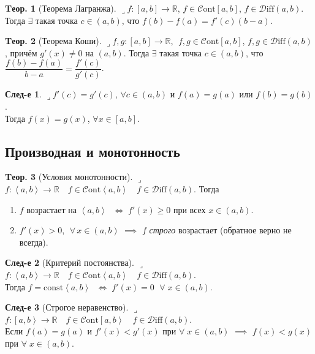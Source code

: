 \documentclass[a4paper,12pt]{article}
\newenvironment{onsamepage} {\begin{minipage}{\textwidth}} {\end{minipage}}
\numberwithin{figure}{section}
\theoremstyle{definition}
\newtheorem{theorem}{Tеор.}[section]
\newtheorem*{corollary}{След-е} %
\def\R{\mathbb{R}}
\def\Cont{\!\in\!\mathcal{C}\mathrm{ont}}
\def\Diff{\!\in\!\mathcal{D}\mathrm{iff}}
\def\on{\!:}
\def\geqs{\geqslant}
\def\intab{\left<a,b\right>}
\def\lets{{\huge$\lrcorner$}\space}
\def\iff{$\;\Longleftrightarrow\;$}
\def\any{$\forall\;$}
\begin{document}
\begin{theorem}[Теорема Лагранжа]
	\lets $f\on[a,b]\to\R$, $f\Cont[a,b]$, $f\Diff(a,b)$. \\
	Тогда $\exists$ такая точка $c\in(a,b)$, что $f(b)-f(a)=f'(c)(b-a)$.
\end{theorem}

\begin{theorem}[Теорема Коши]
	\lets $f,g\on[a,b]\to\R$, $\;f,g\Cont[a,b]$, $f,g\Diff(a,b)$,
	причём $g'(x) \neq 0$ на $(a,b)$.
	Тогда $\exists$ такая точка $c\in(a,b)$,
	что $\dfrac{f(b)-f(a)}{b-a}=\dfrac{f'(c)}{g'(c)}$.
\end{theorem}

\begin{corollary}
	\lets $f'(c)=g'(c)$, $\forall c\in(a,b)$ и $f(a)=g(a)$ или $f(b)=g(b)$. \\
	Тогда $f(x)=g(x)$, $\forall x\in[a,b]$.
\end{corollary}


\subsection{Производная и монотонность}

\begin{onsamepage}
\begin{theorem}[Условия монотонности]
	\lets $f\on\intab\to\R \quad f\Cont\intab \quad f\Diff(a,b)$.
	Тогда \begin{enumerate}
		\item $f$ возрастает на $\intab$ \iff $f'(x) \geqs 0$ при всех $x\in(a,b)$.
		\item $f'(x)>0$, $\;\forall\,x\!\in\!(a,b)$ $\implies$ $f$ \textit{строго} возрастает
			  (обратное верно не всегда).
	\end{enumerate}
\end{theorem}
\end{onsamepage}

\begin{corollary}[Критерий постоянства]
	\lets $f\on\intab\to\R \quad f\Cont\intab \quad f\Diff(a,b)$. \\
	Тогда $f\!=\!\mathrm{const}\intab$ \iff $f'(x)=0$ $\;\forall\;x\in(a,b)$.
\end{corollary}

\begin{corollary}[Строгое неравенство]
	\lets $f\on\left[a,b\right>\to\R \quad f\Cont\left[a,b\right> \quad f\Diff(a,b)$. \\
	Если $f(a)=g(a)$ и $f'(x)<g'(x)$ при \any $x\in(a,b)$ $\implies$ $f(x)<g(x)$ при \any $x\in(a,b)$.
\end{corollary}
\end{document}
